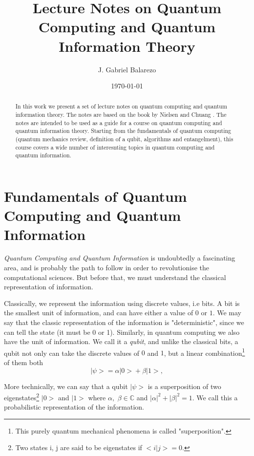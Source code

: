 \documentclass[10pt]{article}
\title{\textsf{\textbf{Lecture Notes on Quantum Computing and Quantum Information Theory}}}
\author{J. Gabriel Balarezo}
\date{\today}
\numberwithin{equation}{section}
\theoremstyle{defi}
\begin{document}
\maketitle \tableofcontents 

\begin{abstract}
  In this work we present a set of lecture notes on quantum computing and quantum information theory. The notes are based on the book by Nielsen and Chuang \cite{nielsen2010quantum}. The notes are intended to be used as a guide for a course on quantum computing and quantum information theory. Starting from the fundamentals of quantum computing (quantum mechanics review, definition of a qubit, algorithms and entangelment), this course covers a wide number of interesnting topics in quantum computing and quantum information.

\end{abstract}

\section{Fundamentals of Quantum Computing and Quantum Information}

\emph{Quantum Computing and Quantum Information} is undoubtedly a fascinating area, and is probably the path to follow in order to revolutionise the computational sciences. But before that, we must understand the classical representation of information.

Classically, we represent the information using discrete values, i.e bits. A bit is the smallest unit of information, and can have either a value of $0$ or $1$.  We may say that the classic representation of the information is "deterministic", since we can tell the state (it must be 0 or 1). Similarly, in quantum computing we also have the unit of information. We call it a \emph{qubit}, and unlike the classical bits, a qubit not only can take the discrete values of $0$ and $1$, but a linear combination\footnote{This purely quantum mechanical phenomena is called "superposition".} of them both
\begin{equation}
  \label{eq:1}
  \big|\psi\big>  = \alpha \big|0\big> + \beta \big|1\big>,
\end{equation}

More technically, we can say that a qubit $\big|\psi\big>$ is a superposition of two eigenstates\footnote{Two states {i, j} are said to be eigenstates if $\big<i\big|j\big>=0$.} $\big|0\big>$ and $\big|1\big>$ where $\alpha,\,\, \beta \in \mathbb{C}$ and $\big|\alpha\big|^2 + \big|\beta\big|^2 = 1$. We call this a probabilistic representation of the information.
\end{document}
